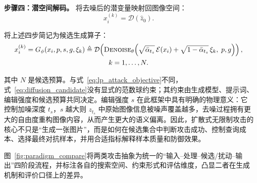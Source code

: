\documentclass[type=bachelor,oneside]{fduthesis}
\begin{document}
\textbf{步骤四：潜空间解码。} 将去噪后的潜变量映射回图像空间：
\begin{equation}
  x_i^{(k)} = \mathcal{D}(\hat{z}_0).
  \label{eq:img2img_decode}
\end{equation}

将上述四步简记为候选生成算子：
\begin{gather}
  x_i^{(k)} = G_\phi(x_i,p,s,g,\xi_k) \triangleq \mathcal{D}\!\left(\textsc{Denoise}_\theta\!\left(\sqrt{\bar{\alpha}_{t_s}}\,\mathcal{E}(x_i) + \sqrt{1-\bar{\alpha}_{t_s}}\,\xi_k,\; p,g\right)\right), \label{eq:diffusion_candidate} \\
  k=1,\ldots,N. \notag
\end{gather}

其中 $N$ 是候选预算。与式~\eqref{eq:lp_attack_objective}不同，式~\eqref{eq:diffusion_candidate}没有显式的范数球约束；其约束由生成模型、提示词、编辑强度和候选预算共同决定。编辑强度 $s$ 在此框架中具有明确的物理意义：它控制加噪深度 $t_s$，$s$ 越大则 $z_{t_s}$ 中原始图像信息被噪声覆盖越多，去噪过程拥有更大的自由度重构图像内容，从而产生更大的语义偏离。因此，扩散式无限制攻击的核心不只是“生成一张图片”，而是如何在候选集合中判断攻击成功、控制查询成本、选择最终对抗样本，并用合适指标解释样本质量和防御效果。

图~\ref{fig:paradigm_compare}将两类攻击抽象为统一的“输入--处理--候选/扰动--输出”四阶段流程，并标注各自的搜索空间、约束形式和评估维度，凸显二者在生成机制和评价口径上的差异。
\end{document}
